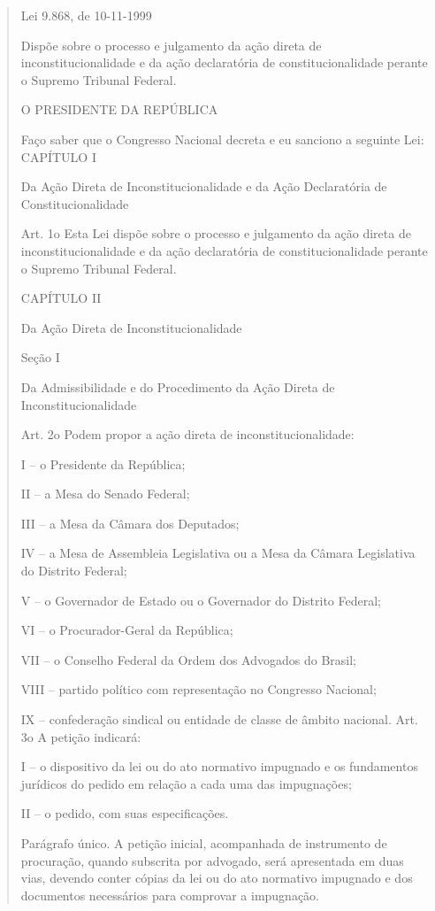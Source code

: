 \documentclass{article}
\begin{document}
\begin{quote}
    Lei 9.868, de 10-11-1999

Dispõe sobre o processo e julgamento da ação direta de inconstitucionalidade e da ação declaratória de constitucionalidade perante o Supremo Tribunal Federal.

O PRESIDENTE DA REPÚBLICA

Faço saber que o Congresso Nacional decreta e eu sanciono a seguinte Lei: CAPÍTULO I

Da Ação Direta de Inconstitucionalidade e da Ação Declaratória de Constitucionalidade

Art. 1o Esta Lei dispõe sobre o processo e julgamento da ação direta de inconstitucionalidade e da ação declaratória de constitucionalidade perante o Supremo Tribunal Federal.

CAPÍTULO II

Da Ação Direta de Inconstitucionalidade

Seção I

Da Admissibilidade e do Procedimento da Ação Direta de Inconstitucionalidade

Art. 2o Podem propor a ação direta de inconstitucionalidade:

I – o Presidente da República;

II – a Mesa do Senado Federal;

III – a Mesa da Câmara dos Deputados;

IV – a Mesa de Assembleia Legislativa ou a Mesa da Câmara Legislativa do Distrito Federal;

V – o Governador de Estado ou o Governador do Distrito Federal;

VI – o Procurador-Geral da República;

VII – o Conselho Federal da Ordem dos Advogados do Brasil;

VIII – partido político com representação no Congresso Nacional;

IX – confederação sindical ou entidade de classe de âmbito nacional. Art. 3o A petição indicará:

I – o dispositivo da lei ou do ato normativo impugnado e os fundamentos jurídicos do pedido em relação a cada uma das impugnações;

II – o pedido, com suas especificações.

Parágrafo único. A petição inicial, acompanhada de instrumento de procuração, quando subscrita por advogado, será apresentada em duas vias, devendo conter cópias da lei ou do ato normativo impugnado e dos documentos necessários para comprovar a impugnação.


\end{quote}
\end{document}
